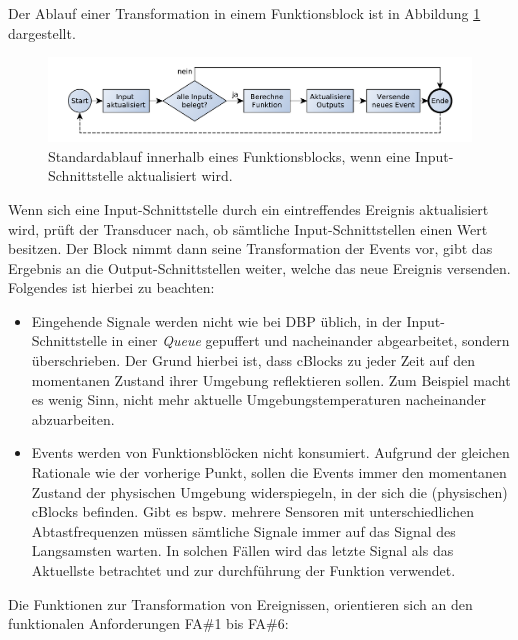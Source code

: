  Der Ablauf einer Transformation in einem Funktionsblock ist in Abbildung \ref{fig:seqfunktionsblock} dargestellt.
 \begin{figure}[h]
  \centering
  \includegraphics[width=1\textwidth]{bilder/chapter4/chapter4_2/funktionsblockablauf.pdf}
  \caption{Standardablauf innerhalb eines Funktionsblocks, wenn eine Input-Schnittstelle aktualisiert wird.}
  \label{fig:seqfunktionsblock}
\end{figure}
Wenn sich eine Input-Schnittstelle durch ein eintreffendes Ereignis aktualisiert wird, prüft der Transducer nach, ob sämtliche Input-Schnittstellen einen Wert besitzen. Der Block nimmt dann seine Transformation der Events vor, gibt das Ergebnis an die Output-Schnittstellen weiter, welche das neue Ereignis versenden. Folgendes ist hierbei zu beachten: 
\begin{itemize}
    \item Eingehende Signale werden nicht wie bei \ac{DBP} üblich, in der Input-Schnittstelle in einer \textit{Queue} gepuffert und nacheinander abgearbeitet, sondern überschrieben. Der Grund hierbei ist, dass cBlocks zu jeder Zeit auf den momentanen Zustand ihrer Umgebung reflektieren sollen. Zum Beispiel macht es wenig Sinn, nicht mehr aktuelle Umgebungstemperaturen nacheinander abzuarbeiten.
    \item Events werden von Funktionsblöcken nicht konsumiert. Aufgrund der gleichen Rationale wie der vorherige Punkt, sollen die Events immer den momentanen Zustand der physischen Umgebung widerspiegeln, in der sich die (physischen) cBlocks befinden. Gibt es bspw. mehrere Sensoren mit unterschiedlichen Abtastfrequenzen müssen sämtliche Signale immer auf das Signal des Langsamsten warten. In solchen Fällen wird das letzte Signal als das Aktuellste betrachtet und zur durchführung der Funktion verwendet.
\end{itemize}
 Die Funktionen zur Transformation von Ereignissen, orientieren sich an den funktionalen Anforderungen FA\#1 bis FA\#6:
